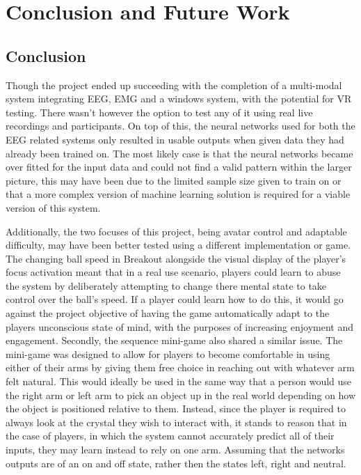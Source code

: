 \documentclass[11pt, a4paper]{article}
\begin{document}
\pagebreak
\section{Conclusion and Future Work}
\subsection{Conclusion}

Though the project ended up succeeding with the completion of a multi-modal system integrating EEG, EMG and a windows system, with the potential for VR testing. There wasn't however the option to test any of it using real live recordings and participants. On top of this, the neural networks used for both the EEG related systems only resulted in usable outputs when given data they had already been trained on. The most likely case is that the neural networks became over fitted for the input data and could not find a valid pattern within the larger picture, this may have been due to the limited sample size given to train on or that a more complex version of machine learning solution is required for a viable version of this system.

\hfill

Additionally, the two focuses of this project, being avatar control and adaptable difficulty, may have been better tested using a different implementation or game. The changing ball speed in Breakout alongside the visual display of the player's focus activation meant that in a real use scenario, players could learn to abuse the system by deliberately attempting to change there mental state to take control over the ball's speed. If a player could learn how to do this, it would go against the project objective of having the game automatically adapt to the players unconscious state of mind, with the purposes of increasing enjoyment and engagement. Secondly, the sequence mini-game also shared a similar issue. The mini-game was designed to allow for players to become comfortable in using either of their arms by giving them free choice in reaching out with whatever arm felt natural. This would ideally be used in the same way that a person would use the right arm or left arm to pick an object up in the real world depending on how the object is positioned relative to them. Instead, since the player is required to always look at the crystal they wish to interact with, it stands to reason that in the case of players, in which the system cannot accurately predict all of their inputs, they may learn instead to rely on one arm. Assuming that the networks outputs are of an on and off state, rather then the states left, right and neutral. 
\end{document}
